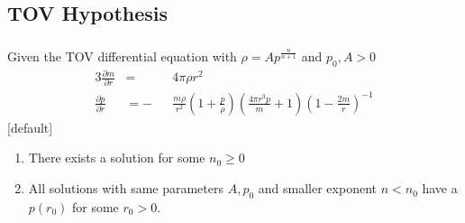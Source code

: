 \subsection{TOV Hypothesis}
\begin{frame}
	\frametitle{\insertsubsection}
	\begin{hypothesis}
		Given the TOV differential equation with $\rho=Ap^{\frac{n}{n+1}}$ and $p_0,A>0$
		\begin{alignat*}{3}
			\frac{\partial m}{\partial r} &= &&4\pi\rho r^2\\
			\frac{\partial p}{\partial r} &= -&&\frac{m\rho}{r^2}\left(1+\frac{p}{\rho}\right)\left(\frac{4\pi r^3p}{m}+1\right)\left(1-\frac{2m}{r}\right)^{-1}
		\end{alignat*}
		[default]
		\begin{enumerate}[<+->][(i)]
			\item There exists a solution for some $n_0\geq0$
			\item All solutions with same parameters $A,p_0$ and smaller exponent $n<n_0$ have a $p(r_0)$ for some $r_0>0$.
		\end{enumerate}
	\end{hypothesis}
\end{frame}


% 		
